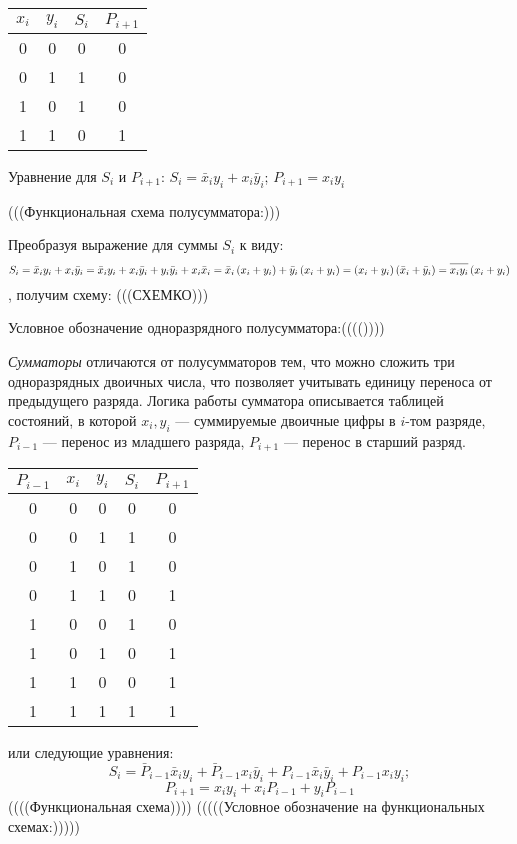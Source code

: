 \documentclass[10pt,a4paper,titlepage]{article}
\begin{document}
\begin{tabular}{|c|c||c|c|}
\hline
$x_i$	&	$y_i$	&	$S_i$	&	$P_{i+1}$\\
\hline
0	&	0	&	0	&	0\\
0	&	1	&	1	&	0\\
1	&	0	&	1	&	0\\
1	&	1	&	0	&	1\\
\hline
\end{tabular}

Уравнение для $S_i$ и $P_{i+1}$: $S_i=\bar{x}_iy_i+x_i\bar{y}_i$; $P_{i+1}=x_iy_i$

(((Функциональная схема полусумматора:)))

Преобразуя выражение для суммы $S_i$ к виду:\[S_i=\bar{x}_iy_i+x_i\bar{y}_i=\bar{x}_iy_i+x_i\bar{y}_i+y_i\bar{y}_i+x_i\bar{x}_i=\bar{x}_i\left(\mathstrut x_i+y_i\right)+\bar{y}_i\left(\mathstrut x_i+y_i\right)=\left(\mathstrut x_i+y_i\right)\left(\mathstrut\bar{x}_i+\bar{y}_i\right)=\overline{\mathstrut x_iy_i}\left(\mathstrut x_i+y_i\right)\], получим схему: (((СХЕМКО)))

Условное обозначение одноразрядного полусумматора:(((())))

\textit{Сумматоры} отличаются от полусумматоров тем, что можно сложить три одноразрядных двоичных числа, что позволяет учитывать единицу переноса от предыдущего разряда.
Логика работы сумматора описывается таблицей состояний, в которой $x_i, y_i$ --- суммируемые двоичные цифры в $i$-том разряде, $P_{i-1}$ --- перенос из младшего разряда, $P_{i+1}$ --- перенос в старший разряд.

\begin{tabular}{|c|c|c||c|c|}
\hline
$P_{i-1}$	&	$x_i$	&	$y_i$	&	$S_i$	&	$P_{i+1}$\\
\hline
0	&	0	&	0	&	0	&	0\\
0	&	0	&	1	&	1	&	0\\
0	&	1	&	0	&	1	&	0\\
0	&	1	&	1	&	0	&	1\\
1	&	0	&	0	&	1	&	0\\
1	&	0	&	1	&	0	&	1\\
1	&	1	&	0	&	0	&	1\\
1	&	1	&	1	&	1	&	1\\
\hline
\end{tabular}
или следующие уравнения:\[S_i=\bar{P}_{i-1}\bar{x}_iy_i+\bar{P}_{i-1}x_i\bar{y}_i+P_{i-1}\bar{x}_i\bar{y}_i+P_{i-1}x_iy_i;\]
\[P_{i+1}=x_iy_i+x_iP_{i-1}+y_iP_{i-1}\]
((((Функциональная схема))))
(((((Условное обозначение на функциональных схемах:)))))
\end{document}
